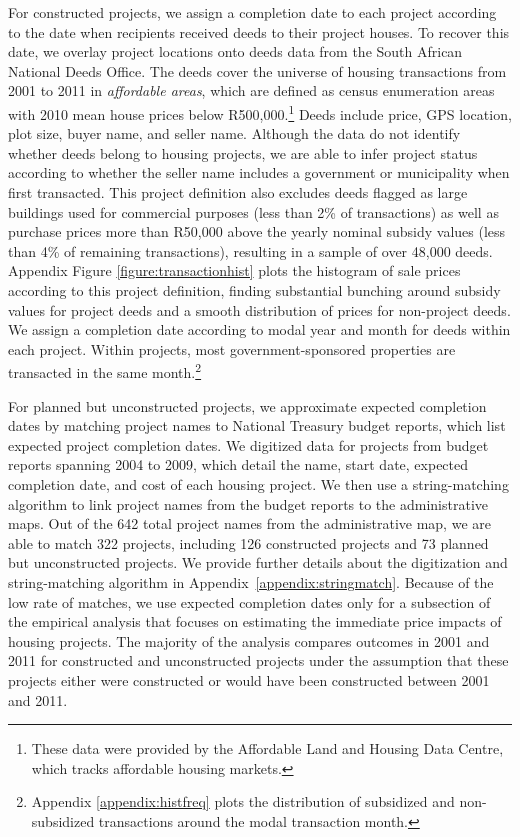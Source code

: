 \documentclass[12pt]{article}
\begin{document}
For constructed projects, we assign a completion date to each project according to the date when recipients received deeds to their project houses.  To recover this date, we overlay project locations onto deeds data from the South African National Deeds Office.  The deeds cover the universe of housing transactions from 2001 to 2011 in {\it affordable areas}, which are defined as census enumeration areas with 2010 mean house prices below R500,000.\footnote{These data were provided by the Affordable Land and Housing Data Centre, which tracks affordable housing markets.} Deeds include price, GPS location, plot size, buyer name, and seller name.  Although the data do not identify whether deeds belong to housing projects, we are able to infer project status according to whether the seller name includes a government or municipality when first transacted.  This project definition also excludes deeds flagged as large buildings used for commercial purposes (less than 2\% of transactions) as well as purchase prices more than R50,000 above the yearly nominal subsidy values (less than 4\% of remaining transactions), resulting in a sample of over 48,000 deeds.  Appendix Figure \ref{figure:transactionhist} plots the histogram of sale prices according to this project definition, finding substantial bunching around subsidy values for project deeds and a smooth distribution of prices for non-project deeds.  We assign a completion date according to modal year and month for deeds within each project.  Within projects, most government-sponsored properties are transacted in the same month.\footnote{Appendix \ref{appendix:histfreq} plots the distribution of subsidized and non-subsidized transactions around the modal transaction month.} 

For planned but unconstructed projects, we approximate expected completion dates by matching project names to National Treasury budget reports, which list expected project completion dates.  We digitized data for projects from budget reports spanning 2004 to 2009, which detail the name, start date, expected completion date, and cost of each housing project.  We then use a string-matching algorithm to link project names from the budget reports to the administrative maps.  Out of the 642 total project names from the administrative map, we are able to match 322 projects, including 126 constructed projects and 73 planned but unconstructed projects.  We provide further details about the digitization and string-matching algorithm in Appendix~\ref{appendix:stringmatch}.  Because of the low rate of matches, we use expected completion dates only for a subsection of the empirical analysis that focuses on estimating the immediate price impacts of housing projects.  The majority of the analysis compares outcomes in 2001 and 2011 for constructed and unconstructed projects under the assumption that these projects either were constructed or would have been constructed between 2001 and 2011.
\end{document}

